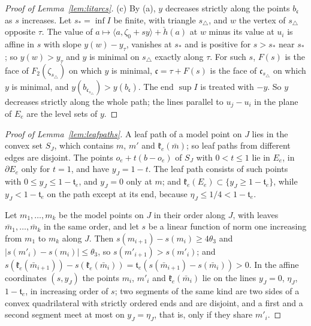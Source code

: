 \begin{proof}[Proof of Lemma~\ref{lem:litarcs}]
(c) By (a), $y$ decreases strictly along the points $b_{\mathfrak c}$ as $s$ increases. Let $s_*=\inf I$ be finite,
with triangle ${s_\triangle}$, and $w$ the vertex of ${s_\triangle}$ opposite $\tau$. The value of $a\mapsto\langle
a,\zeta_0+sy\rangle+\check h(a)$ at $w$ minus its value at $u_i$ is affine in $s$ with slope $y(w)-y_\tau$, vanishes at
$s_*$ and is positive for $s>s_*$ near $s_*$; so $y(w)>y_\tau$ and $y$ is minimal on ${s_\triangle}$ exactly along $\tau$. For
such $s$, $F(s)$ is the face of $F_2(\zeta_{s_\triangle})$ on which $y$ is minimal, $\mathfrak c=\tau+F(s)$ is the face of
$\mathfrak c_{s_\triangle}$ on which $y$ is minimal, and $y(b_{\mathfrak c_{s_\triangle}})>y(b_{\mathfrak c})$. The end $\sup I$ is
treated with $-y$. So $y$ decreases strictly along the whole path; the lines parallel to $u_j-u_i$ in the plane of
$E_e$ are the level sets of $y$.
\end{proof}

\begin{proof}[Proof of Lemma~\ref{lem:leafpaths}]
A leaf path of a model point on $J$ lies in the convex set $S_J$, which contains $m$, $m'$ and $\mathfrak k_e(\bar m)$; so
leaf paths from different edges are disjoint. The points $o_e+t(b-o_e)$ of $S_J$ with $0<t\le1$ lie in $E_e$, in
$\partial E_e$ only for $t=1$, and have $y_J=1-t$. The leaf path consists of such points with $0\le
y_J\le1-\mathfrak t_e$, and $y_J=0$ only at $m$; and $\mathfrak k_e(E_e)\subset\{y_J\ge1-\mathfrak t_e\}$, while $y_J<1-\mathfrak t_e$
on the path except at its end, because $\eta_J\le1/4<1-\mathfrak t_e$.

Let $m_1,\dots,m_k$ be the model points on $J$ in their order along $J$, with leaves $\bar m_1,\dots,\bar m_k$ in the
same order, and let $s$ be a linear function of norm one increasing from $m_1$ to $m_k$ along $J$. Then
$s(m_{i+1})-s(m_i)\ge4\theta_3$ and $|s(m'_i)-s(m_i)|\le\theta_3$, so $s(m'_{i+1})>s(m'_i)$; and $s(\mathfrak k_e(\bar
m_{i+1}))-s(\mathfrak k_e(\bar m_i))=\mathfrak t_e(s(\bar m_{i+1})-s(\bar m_i))>0$. In the affine coordinates $(s,y_J)$ the
points $m_i$, $m'_i$ and $\mathfrak k_e(\bar m_i)$ lie on the lines $y_J=0$, $\eta_J$, $1-\mathfrak t_e$, in increasing order of
$s$; two segments of the same kind are two sides of a convex quadrilateral with strictly ordered ends and are disjoint,
and a first and a second segment meet at most on $y_J=\eta_J$, that is, only if they share $m'_i$.
\end{proof}

